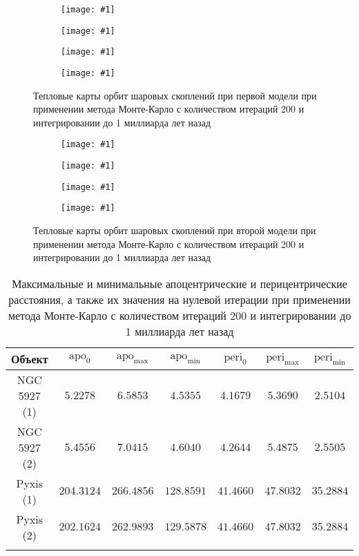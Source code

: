 \documentclass[a4paper, oneside]{article}
\newlength{\imagewidth}
\newlength{\imageheight}
\newcommand{\subgraphics}[1]{
\settowidth{\imagewidth}{\texttt{[image: \#1]}}%
\begin{subfigure}{\imagewidth}%
    \texttt{[image: \#1]}%
\end{subfigure}%
}
\begin{document}
\begin{figure}[h!]
  \centering
  \setlength{\imageheight}{4.15cm}
  \subgraphics{simulations/M1/NGC 5927/NGC 5927 (Simulated orbits, XY)}
  \subgraphics{simulations/M1/NGC 5927/NGC 5927 (Simulated orbits, RZ)}
  \subgraphics{simulations/M1/Pyxis/Pyxis (Simulated orbits, XY)}
  \subgraphics{simulations/M1/Pyxis/Pyxis (Simulated orbits, RZ)}
  \caption{Тепловые карты орбит шаровых скоплений при первой модели при применении метода Монте-Карло с количеством итераций 200 и интегрировании до 1 миллиарда лет назад}
\end{figure}

\begin{figure}[h!]
  \centering
  \setlength{\imageheight}{4.15cm}
  \subgraphics{simulations/M2/NGC 5927/NGC 5927 (Simulated orbits, XY)}
  \subgraphics{simulations/M2/NGC 5927/NGC 5927 (Simulated orbits, RZ)}
  \subgraphics{simulations/M2/Pyxis/Pyxis (Simulated orbits, XY)}
  \subgraphics{simulations/M2/Pyxis/Pyxis (Simulated orbits, RZ)}
  \caption{Тепловые карты орбит шаровых скоплений при второй модели при применении метода Монте-Карло с количеством итераций 200 и интегрировании до 1 миллиарда лет назад}
\end{figure}

\newpage

\begin{table}[h]
  \centering
  \caption{Максимальные и минимальные апоцентрические и перицентрические расстояния, а также их значения на нулевой итерации при применении метода Монте-Карло с количеством итераций 200 и интегрировании до 1 миллиарда лет назад}
  \begin{tabular}{ccccccc}
    \toprule
    Объект &
    $ \text{apo}_0 $ &
    $ \text{apo}_\text{max} $ &
    $ \text{apo}_\text{min} $ &
    $ \text{peri}_0 $ &
    $ \text{peri}_\text{max} $ &
    $ \text{peri}_\text{min} $ \\
    \midrule
    \arrayrulecolor{black!40}
    NGC 5927 (1) & $ 5.2278 $ & $ 6.5853 $ & $ 4.5355 $ & $ 4.1679 $ & $ 5.3690 $ & $ 2.5104 $ \\
    \midrule
    NGC 5927 (2) & $ 5.4556 $ & $ 7.0415 $ & $ 4.6040 $ & $ 4.2644 $ & $ 5.4875 $ & $ 2.5505 $ \\
    \midrule
    Pyxis (1) & $ 204.3124 $ & $ 266.4856 $ & $ 128.8591 $ & $ 41.4660 $ & $ 47.8032 $ & $ 35.2884 $ \\
    \midrule
    Pyxis (2) & $ 202.1624 $ & $ 262.9893 $ & $ 129.5878 $ & $ 41.4660 $ & $ 47.8032 $ & $ 35.2884 $ \\
    \arrayrulecolor{black}
    \bottomrule
  \end{tabular}
\end{table}
\end{document}
